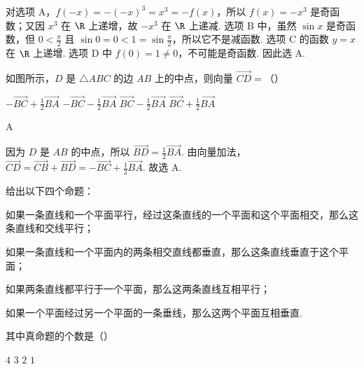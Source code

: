 \begin{solution}
对选项 A，\(f(-x)=-(-x)^3=x^3=-f(x)\)，所以 \(f(x)=-x^3\) 是奇函数；又因 \(x^3\) 在 \(\R\) 上递增，故 \(-x^3\) 在 \(\R\) 上递减. 选项 B 中，虽然 \(\sin x\) 是奇函数，但 \(0<\frac\pi2\) 且 \(\sin0=0<1=\sin\frac\pi2\)，所以它不是减函数. 选项 C 的函数 \(y=x\) 在 \(\R\) 上递增. 选项 D 中 \(f(0)=1\ne0\)，不可能是奇函数. 因此选 A.
\end{solution}

\begin{problem}
如图所示，\(D\) 是 \(\triangle ABC\) 的边 \(AB\) 上的中点，则向量 \(\overrightarrow{CD} =\)（\quad）


\choices
    {\(-\overrightarrow{BC} + \frac{1}{2}\overrightarrow{BA}\)}
    {\(-\overrightarrow{BC} - \frac{1}{2}\overrightarrow{BA}\)}
    {\(\overrightarrow{BC} - \frac{1}{2}\overrightarrow{BA}\)}
    {\(\overrightarrow{BC} + \frac{1}{2}\overrightarrow{BA}\)}
\end{problem}

\begin{answer}
A
\end{answer}

\begin{solution}
因为 \(D\) 是 \(AB\) 的中点，所以 \(\overrightarrow{BD}=\frac12\overrightarrow{BA}\). 由向量加法，
\(\overrightarrow{CD}=\overrightarrow{CB}+\overrightarrow{BD}=-\overrightarrow{BC}+\frac12\overrightarrow{BA}\).
故选 A.
\end{solution}

\begin{problem}
给出以下四个命题：

\begin{circlelist}
\item 如果一条直线和一个平面平行，经过这条直线的一个平面和这个平面相交，那么这条直线和交线平行；
\item 如果一条直线和一个平面内的两条相交直线都垂直，那么这条直线垂直于这个平面；
\item 如果两条直线都平行于一个平面，那么这两条直线互相平行；
\item 如果一个平面经过另一个平面的一条垂线，那么这两个平面互相垂直.
\end{circlelist}

其中真命题的个数是（\quad）

\choices
    {\(4\)}
    {\(3\)}
    {\(2\)}
    {\(1\)}
\end{problem}

